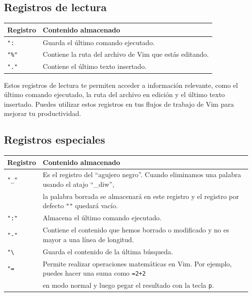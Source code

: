 \documentclass[
  doc,
  floatsintext,
  longtable,
  a4paper,
  nolmodern,
  notxfonts,
  notimes,
  12pt,
  colorlinks=true,linkcolor=blue,citecolor=blue,urlcolor=blue]{apa7}
\newcounter{none} %
\begin{document}
\subsection{Registros de lectura}\label{registros-de-lectura}

{\def\LTcaptype{none} %
\begin{longtable}[]{@{}ll@{}}
\toprule\noalign{}
Registro & Contenido almacenado \\
\midrule\noalign{}
\endhead
\bottomrule\noalign{}
\endlastfoot
\texttt{":} & Guarda el último comando ejecutado. \\
\texttt{"\%"} & Contiene la ruta del archivo de Vim que estás
editando. \\
\texttt{"."} & Contiene el último texto insertado. \\
\end{longtable}
}

Estos registros de lectura te permiten acceder a información relevante,
como el último comando ejecutado, la ruta del archivo en edición y el
último texto insertado. Puedes utilizar estos registros en tus flujos de
trabajo de Vim para mejorar tu productividad.

\subsection{Registros especiales}\label{registros-especiales}

{\def\LTcaptype{none} %
\begin{longtable}[]{@{}
  >{\raggedright\arraybackslash}p{}
  >{\raggedright\arraybackslash}p{}@{}}
\toprule\noalign{}
\begin{minipage}[b]{\linewidth}\raggedright
Registro
\end{minipage} & \begin{minipage}[b]{\linewidth}\raggedright
Contenido almacenado
\end{minipage} \\
\midrule\noalign{}
\endhead
\bottomrule\noalign{}
\endlastfoot
\texttt{"\_"} & Es el registro del ``agujero negro''. Cuando eliminamos
una palabra usando el atajo ``\_diw'', \\
& la palabra borrada se almacenará en este registro y el registro por
defecto \texttt{""} quedará vacío. \\
\texttt{":"} & Almacena el último comando ejecutado. \\
\texttt{"-"} & Contiene el contenido que hemos borrado o modificado y no
es mayor a una línea de longitud. \\
\texttt{"\textbackslash{}} & Guarda el contenido de la última
búsqueda. \\
\texttt{"=} & Permite realizar operaciones matemáticas en Vim. Por
ejemplo, puedes hacer una suma como \texttt{=2+2} \\
& en modo normal y luego pegar el resultado con la tecla \texttt{p}. \\
\end{longtable}
}
\end{document}
